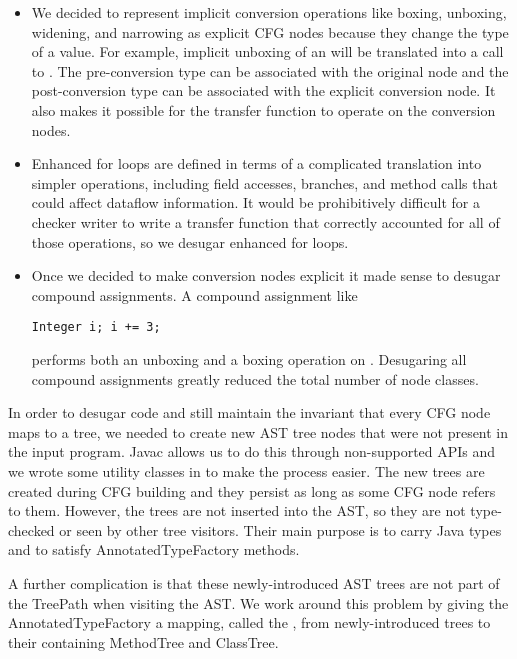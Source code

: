     \begin{itemize}
    \item We decided to represent implicit conversion operations like
      boxing, unboxing, widening, and narrowing as explicit CFG nodes
      because they change the type of a value.  For example, implicit
      unboxing of an  will be translated into a call to
      .  The pre-conversion type can be
      associated with the original node and the post-conversion type
      can be associated with the explicit conversion node.  It also
      makes it possible for the transfer function to operate on the
      conversion nodes.

    \item Enhanced for loops are defined in terms of a complicated
      translation into simpler operations, including field accesses,
      branches, and method calls that could affect dataflow
      information.  It would be prohibitively difficult for a checker
      writer to write a transfer function that correctly accounted for
      all of those operations, so we desugar enhanced for loops.

    \item Once we decided to make conversion nodes explicit it made
      sense to desugar compound assignments.  A compound assignment
      like \begin{verbatim}Integer i; i += 3;\end{verbatim} performs
      both an unboxing and a boxing operation on .  Desugaring
      all compound assignments greatly reduced the total number of
      node classes.

    \end{itemize}

In order to desugar code and still maintain the invariant that every
CFG node maps to a tree, we needed to create new AST tree nodes that
were not present in the input program.  Javac allows us to do this
through non-supported APIs and we wrote some utility classes in
 to make the process easier.  The new trees are
created during CFG building and they persist as long as some CFG node
refers to them.  However, the trees are not inserted into the AST, so
they are not type-checked or seen by other tree visitors.  Their main
purpose is to carry Java types and to satisfy AnnotatedTypeFactory
methods.

A further complication is that these newly-introduced AST trees are
not part of the TreePath when visiting the AST.  We work around this
problem by giving the AnnotatedTypeFactory a mapping, called the
, from newly-introduced trees to their containing
MethodTree and ClassTree.

